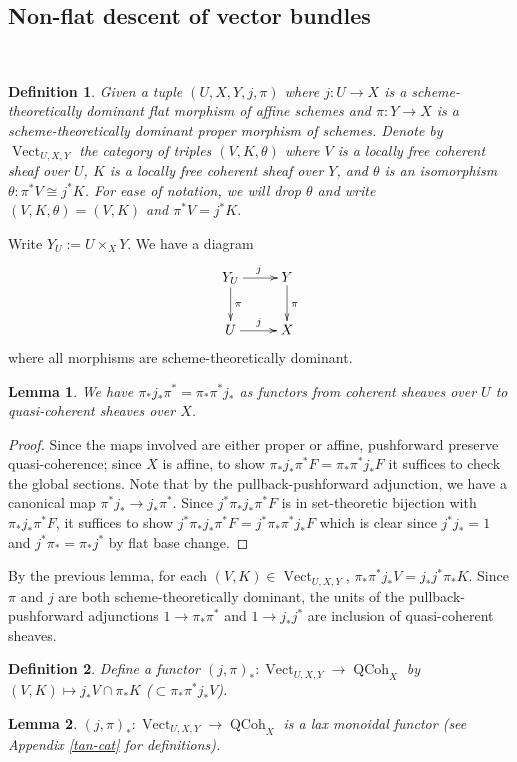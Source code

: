 \documentclass[11pt]{amsart}
\newtheorem{lem}{Lemma}
\newtheorem{dfn}{Definition}
\numberwithin{thm}{section}
\numberwithin{lem}{section}
\numberwithin{cor}{section}
\numberwithin{prop}{section}
\numberwithin{exam}{section}
\numberwithin{dfn}{section}
\newcommand{\Vect}{\operatorname{Vect}}
\newcommand{\QCoh}{\operatorname{QCoh}}
\newcommand{\mysection}{\subsection}
\begin{document}
\begin{appendices}
\mysection{Non-flat descent of vector bundles}~

\begin{dfn}
\label{def:fun-ext-vect}
Given a tuple $(U, X, Y, j, \pi)$
where $j:U\to X$ is a scheme-theoretically dominant
flat morphism of affine schemes
and $\pi:Y\to X$ is a scheme-theoretically dominant
proper morphism of schemes.
Denote by $\Vect_{U, X, Y}$
the category of triples
$(V, K, \theta)$ where $V$ is a locally free coherent sheaf over $U$,
$K$ is a locally free coherent sheaf over $Y$,
and $\theta$ is an isomorphism $\theta: \pi^*V \cong j^*K$.
For ease of notation, we will drop $\theta$
and write $(V, K, \theta)=(V,K)$ and $\pi^*V = j^*K$.
\end{dfn}

Write $Y_U:= U\times_X Y$.
We have a diagram
$$
\xymatrix{
    Y_U \ar[d]^\pi \ar[r]^j & Y \ar[d]^\pi\\
    U \ar[r]^j & X
}
$$
where all morphisms are scheme-theoretically dominant.

\begin{lem}
\label{lem:fun-ext-1}
We have $\pi_*j_*\pi^* = \pi_*\pi^*j_*$
as functors from coherent sheaves over $U$ to quasi-coherent sheaves
over $X$.
\end{lem}

\begin{proof}
Since the maps involved are either
proper or affine,
pushforward preserve quasi-coherence;
since $X$ is affine,
to show
$\pi_*j_*\pi^*F = \pi_*\pi^*j_*F$
it suffices to check the global sections.
Note that by the pullback-pushforward adjunction,
we have a canonical map $\pi^*j_*\to j_*\pi^*$.
Since $j^*\pi_*j_*\pi^*F$
is in set-theoretic bijection with
$\pi_*j_*\pi^*F$,
it suffices to show
$j^*\pi_*j_*\pi^*F = j^*\pi_*\pi^*j_*F$
which is clear since $j^*j_*=1$ and $j^*\pi_*=\pi_*j^*$
by flat base change.
\end{proof}

By the previous lemma,
for each $(V, K)\in \Vect_{U,X,Y}$,
    $\pi_*\pi^*j_*V = j_*j^*\pi_*K$.
Since $\pi$ and $j$ are both scheme-theoretically
dominant, the units of the pullback-pushforward adjunctions
$1\to \pi_*\pi^*$ and $1\to j_*j^*$
are inclusion of quasi-coherent sheaves.

\begin{dfn}
Define a functor
$(j, \pi)_*: \Vect_{U, X, Y} \to \QCoh_X$
by $(V, K)\mapsto j_*V \cap \pi_*K$ ($\subset \pi_*\pi^*j_*V$).
\end{dfn}

\begin{lem}
$(j, \pi)_*: \Vect_{U, X, Y}\to \QCoh_X$
is a lax monoidal functor (see Appendix \ref{tan-cat} for definitions).
\end{lem}




\end{appendices}
\end{document}

